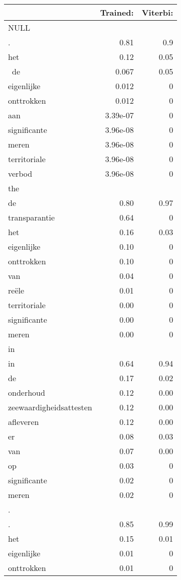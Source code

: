 \begin{table}
\begin{tabular}{l r r}

		&Trained:	&Viterbi:\\\hline\hline
NULL &&\\\hline
.		&0.81		&0.9\\
het		&0.12		&0.05\\\
de		&0.067	&0.05\\
eigenlijke	&0.012	&0\\
onttrokken	&0.012	&0\\
aan		&3.39e-07	&0\\
significante	&3.96e-08	&0\\
meren		&3.96e-08	&0\\
territoriale	&3.96e-08	&0\\
verbod	&3.96e-08	&0\\\hline\hline
%
the&&\\\hline		
de		&0.80		&0.97\\
transparantie &0.64	&0\\
het		&0.16		&0.03\\
eigenlijke	&0.10		&0\\
onttrokken	&0.10		&0\\
van		&0.04		&0\\
re\"ele	&0.01		&0\\
territoriale	&0.00		&0\\
significante	&0.00		&0\\
meren		&0.00		&0\\\hline\hline
%
in	&&\\\hline
in				&0.64	&0.94\\
de				&0.17	&0.02\\
onderhoud			&0.12	&0.00\\
zeewaardigheidsattesten	&0.12	&0.00\\
afleveren			&0.12	&0.00\\
er				&0.08	&0.03\\
van				&0.07	&0.00\\
op				&0.03	&0\\
significante			&0.02	&0\\
meren				&0.02	&0\\\hline\hline
%
.&&\\\hline
.		&0.85		&0.99\\
het		&0.15		&0.01\\
eigenlijke	&0.01 	&0\\
onttrokken	&0.01		&0\\

\end{tabular}
\end{table}
